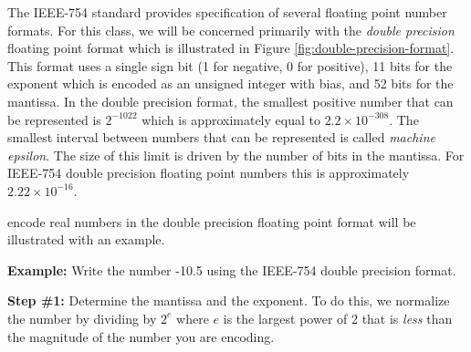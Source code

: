 The IEEE-754 standard provides specification of several floating point number formats.  For this class, we will be concerned primarily with the \emph{double precision} floating point format which is illustrated in Figure \ref{fig:double-precision-format}.  This format uses a single sign bit (1 for negative, 0 for positive), 11 bits for the exponent which is encoded as an unsigned integer with bias, and 52 bits for the mantissa.  In the double precision format, the smallest positive number that can be represented is $2^{-1022}$ which is approximately equal to $2.2 \times 10^{-308}$. The smallest interval between numbers that can be represented is called \emph{machine epsilon}.  The size of this limit is driven by the number of bits in the mantissa.  For IEEE-754 double precision floating point numbers this is approximately $2.22 \times 10^{-16}$.

 encode real numbers in the double precision floating point format will be illustrated with an example.

\vspace{0.5cm}

\noindent\textbf{Example:} Write the number -10.5 using the IEEE-754 double precision format.

\vspace{0.25cm}

\noindent\textbf{Step \#1:} Determine the mantissa and the exponent.  To do this, we normalize the number by dividing by $2^e$ where $e$ is the largest power of 2 that is \emph{less} than the magnitude of the number you are encoding.  

